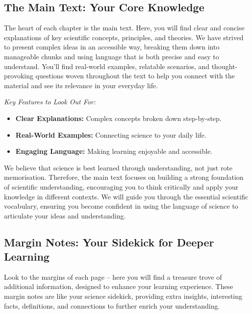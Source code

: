 \subsection{The Main Text: Your Core Knowledge}

The heart of each chapter is the main text.  Here, you will find clear and concise explanations of key scientific concepts, principles, and theories.  We have strived to present complex ideas in an accessible way, breaking them down into manageable chunks and using language that is both precise and easy to understand.  You'll find real-world examples, relatable scenarios, and thought-provoking questions woven throughout the text to help you connect with the material and see its relevance in your everyday life.

\begin{marginnote}
\textit{Key Features to Look Out For:}
\begin{itemize}
    \item \textbf{Clear Explanations:} Complex concepts broken down step-by-step.
    \item \textbf{Real-World Examples:} Connecting science to your daily life.
    \item \textbf{Engaging Language:}  Making learning enjoyable and accessible.
\end{itemize}
\end{marginnote}

We believe that science is best learned through understanding, not just rote memorisation.  Therefore, the main text focuses on building a strong foundation of scientific understanding, encouraging you to think critically and apply your knowledge in different contexts. We will guide you through the essential scientific vocabulary, ensuring you become confident in using the language of science to articulate your ideas and understanding.

\FloatBarrier

\subsection{Margin Notes: Your Sidekick for Deeper Learning}

Look to the margins of each page – here you will find a treasure trove of additional information, designed to enhance your learning experience.  These margin notes are like your science sidekick, providing extra insights, interesting facts, definitions, and connections to further enrich your understanding.

